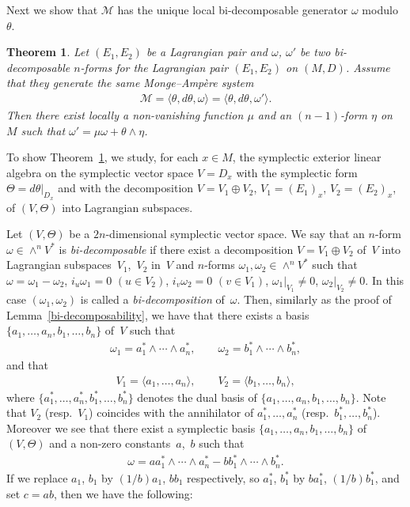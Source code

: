 \documentclass[11pt]{article}
\newtheorem{Th}{Theorem}[section]
\begin{document}
Next we show that $\mathcal{M}$ has the unique
local bi-decomposable generator $\omega$ modulo $\theta$.

\begin{Th}
\label{bi-decomposable-form}
Let $(E_1, E_2)$ be a Lagrangian pair and
$\omega$, $\omega'$ be two bi-decomposable $n$-forms
for the Lagrangian pair $(E_1, E_2)$ on $(M, D)$.
Assume that they generate the same Monge--Amp{\`e}re system
\begin{gather*}
{\mathcal M} =
\langle \theta, d\theta, \omega \rangle
=
\langle \theta, d\theta, \omega' \rangle.
\end{gather*}
Then there exist
locally a non-vanishing function $\mu$ and an $(n-1)$-form $\eta$
on $M$ such that $\omega' = \mu \omega + \theta \wedge \eta$.
\end{Th}

To show Theorem~\ref{bi-decomposable-form},
we study, for each $x \in M$, the symplectic exterior linear algebra
on the symplectic vector space $V = D_x$ with the symplectic form
$\Theta = d\theta\vert_{D_x}$ and with the decomposition
$V = V_1\oplus V_2$, $V_1 = (E_1)_x$, $V_2 = (E_2)_x$,
of $(V, \Theta)$ into Lagrangian subspaces.


Let $(V,\Theta)$ be a $2n$-dimensional symplectic vector space.
We say that an $n$-form $\omega \in \wedge^n V^*$ is
{\it bi-decomposable} if
there exist a decomposition $V = V_1\oplus V_2$ of~$V$ into
Lagrangian sub\-spa\-ces~$V_1$,~$V_2$ in~$V$ and
$n$-forms $\omega_1, \omega_2 \in \wedge^n V^*$ such
that $\omega = \omega_1 - \omega_2$,
$i_u\omega_1 = 0$ $(u \in V_2)$, $i_v\omega_2 = 0$ $(v \in V_1)$,
$\omega_1\vert_{V_1} \not= 0$, $\omega_2\vert_{V_2} \not= 0$.
In this case $(\omega_1, \omega_2)$ is called a {\it bi-decomposition}
of~$\omega$.
Then, similarly as the proof of Lemma~\ref{bi-decomposability}, we have that
there exists a basis
$\{ a_1,\dots, a_n, b_1,\dots, b_n\}$ of~$V$
such that
\begin{gather*}
\omega_1 = a_1^*\wedge \cdots \wedge a_n^*, \qquad
\omega_2 = b_1^*\wedge \cdots \wedge b_n^*,
\end{gather*}
and that
\begin{gather*}
V_1= \langle a_1,\dots, a_n\rangle,
\qquad
V_2= \langle b_1,\dots, b_n\rangle,
\end{gather*}
where $\{ a_1^*,\dots, a_n^*, b_1^*,\dots, b_n^*\}$ denotes the dual basis
of $\{ a_1,\dots, a_n, b_1,\dots, b_n\}$.
Note that
$V_2$ (resp.~$V_1$) coincides with the annihilator of $a_1^*,\dots, a_n^*$
(resp.~$b_1^*,\dots, b_n^*$).
Moreover we see that
there exist a symplectic basis $\{ a_1,\dots, a_n, b_1,\dots, b_n\}$
of $(V, \Theta)$
and a non-zero constants~$a$,~$b$ such that
\begin{gather*}
\omega =
a   a_1^*\wedge \cdots \wedge a_n^* - b   b_1^*\wedge \cdots \wedge b_n^*.
\end{gather*}
If we replace $a_1$, $b_1$ by $(1/b) a_1$, $b b_1$
respectively,
so $a_1^*$, $b_1^*$ by $b a_1^*$, $(1/b) b_1^*$,
and set $c = ab$, then we have the following:
\end{document}
